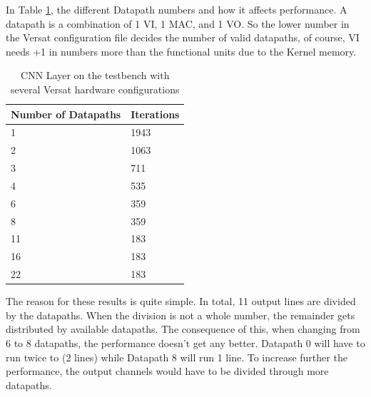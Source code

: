 In Table \ref{table:Iterations}, the different Datapath numbers and how it affects performance.
A datapath is a combination of 1 VI, 1 MAC, and 1 VO. So the lower number in the Versat configuration file
decides the number of valid datapaths, of course, VI needs +1 in numbers more than the functional units due to the Kernel memory.
\newpage
\begin{table}[!htpb]
    \centering
    \begin{tabular}{ll}
    \hline
    \textbf{Number of Datapaths} &  \textbf{Iterations}        \\ \hline
    1          & 1943                 \\
	2          & 1063                 \\
	3          & 711                 \\
	4          & 535                 \\
	6          & 359                 \\
	8          & 359                 \\
	11          & 183                 \\
	16          & 183                 \\
    22            & 183                       \\  \hline
    \end{tabular}
    \label{table:Iterations}
    \caption{CNN Layer on the testbench with several Versat hardware configurations}
\end{table}

The reason for these results is quite simple. In total, 11 output lines are divided
by the datapaths. When the division is not a whole number, the remainder gets distributed
by available datapaths. The consequence of this, when changing from 6 to 8 datapaths, the performance
doesn't get any better. Datapath 0 will have to run twice to (2 lines) while Datapath 8 will run 1 line.
To increase further the performance, the output channels would have to be divided through more datapaths.
